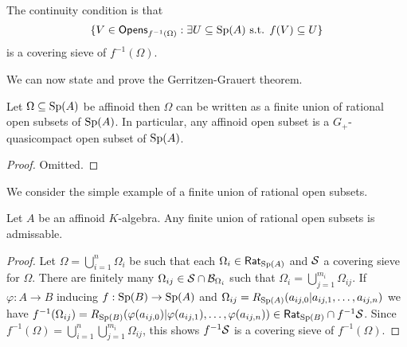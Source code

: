 \begin{remark}
    The continuity condition is that 
    $$\{V\in\mathsf{Opens}_{f^{-1}(\Omega)}:\exists U\subseteq \mathrm{Sp}(A)\text{ s.t. }f(V)\subseteq U\}$$ 
    is a covering sieve of $f^{-1}(\Omega)$. 
\end{remark}
We can now state and prove the Gerritzen-Grauert theorem. 
\begin{theorem}\label{thm: GG thm}
    Let $\Omega\subseteq\mathrm{Sp}(A)$ be affinoid then $\Omega$ can be written as a finite union of rational open subsets of $\mathrm{Sp}(A)$. In particular, any affinoid open subset is a $G_{+}$-quasicompact open subset of $\mathrm{Sp}(A)$.
\end{theorem}
\begin{proof}
    Omitted. 
\end{proof}
We consider the simple example of a finite union of rational open subsets. 
\begin{proposition}\label{prop: finite union of rationals is admissable}
    Let $A$ be an affinoid $K$-algebra. Any finite union of rational open subsets is admissable. 
\end{proposition}
\begin{proof}
    Let $\Omega=\bigcup_{i=1}^{n}\Omega_{i}$ be such that each $\Omega_{i}\in\mathsf{Rat}_{\mathrm{Sp}(A)}$ and $\mathcal{S}$ a covering sieve for $\Omega$. There are finitely many $\Omega_{ij}\in\mathcal{S}\cap\mathcal{B}_{\Omega_{i}}$ such that $\Omega_{i}=\bigcup_{j=1}^{m_{i}}\Omega_{ij}$. If $\varphi:A\to B$ inducing $f:\mathrm{Sp}(B)\to\mathrm{Sp}(A)$ and $\Omega_{ij}=R_{\mathrm{Sp}(A)}(a_{ij,0}|a_{ij,1},\dots,a_{ij,n})$ we have $f^{-1}(\Omega_{ij})=R_{\mathrm{Sp}(B)}(\varphi(a_{ij,0})|\varphi(a_{ij,1}),\dots,\varphi(a_{ij,n}))\in\mathsf{Rat}_{\mathrm{Sp}(B)}\cap f^{-1}\mathcal{S}$. Since $f^{-1}(\Omega)=\bigcup_{i=1}^{n}\bigcup_{j=1}^{m_{i}}\Omega_{ij}$, this shows $f^{-1}\mathcal{S}$ is a covering sieve of $f^{-1}(\Omega)$. 
\end{proof} %
